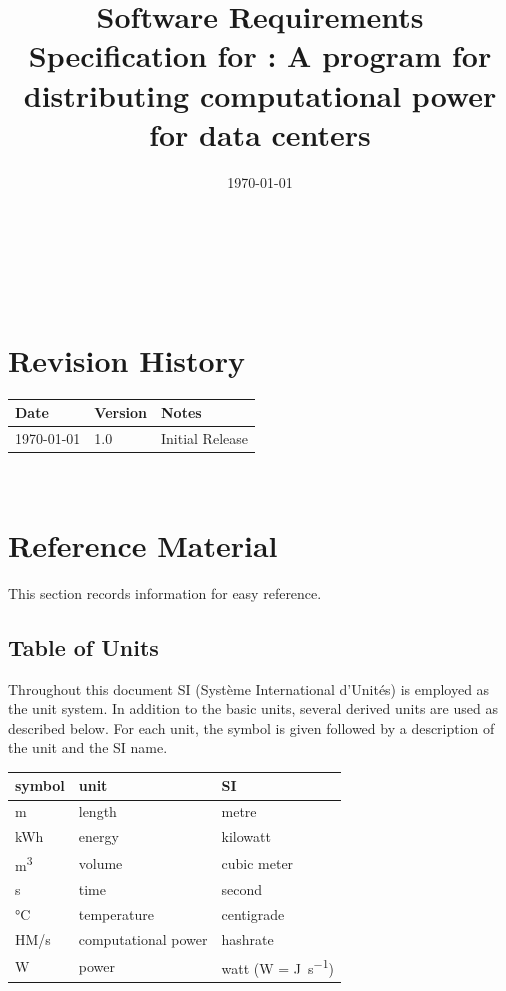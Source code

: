 \documentclass[12pt]{article}
\begin{document}
\title{Software Requirements Specification for \progname:
A program for distributing computational power for data centers} 
\author{\authname}
\date{\today}
	
\maketitle

~\newpage


\tableofcontents

~\newpage

\section*{Revision History}

\begin{tabularx}{\textwidth}{p{3cm}p{2cm}X}
\toprule {\bf Date} & {\bf Version} & {\bf Notes}\\
\midrule
\today & 1.0 & Initial Release\\
\bottomrule
\end{tabularx}

~\newpage

\section{Reference Material}

This section records information for easy reference.

\subsection{Table of Units}

Throughout this document SI (Syst\`{e}me International d'Unit\'{e}s) is employed
as the unit system.  In addition to the basic units, several derived units are
used as described below.  For each unit, the symbol is given followed by a
description of the unit and the SI name.
~\newline

\renewcommand{\arraystretch}{1.2}
  \noindent \begin{tabular}{l l l} 
    \toprule		
    \textbf{symbol} & \textbf{unit} & \textbf{SI}\\
    \midrule 
    \si{\metre} & length & metre\\
    \si{\kWh} & energy	& kilowatt\\
    \si{\m^3} & volume	& cubic meter\\
    \si{\second} & time & second\\
    \si{\celsius} & temperature & centigrade\\
    \si{HM/s} & computational power & hashrate\\
    \si{\watt} & power & watt (W = \si{\joule\per\second})\\
    \bottomrule
  \end{tabular}
\end{document}
